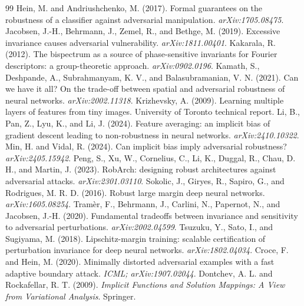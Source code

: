 \documentclass[11pt]{article}
\theoremstyle{plain}
\theoremstyle{definition}
\theoremstyle{remark}
\begin{document}
\begin{thebibliography}{99}
 Hein, M. and Andriushchenko, M. (2017). Formal guarantees on the robustness of a classifier against adversarial manipulation. \emph{arXiv:1705.08475}.
 Jacobsen, J.-H., Behrmann, J., Zemel, R., and Bethge, M. (2019). Excessive invariance causes adversarial vulnerability. \emph{arXiv:1811.00401}.
 Kakarala, R. (2012). The bispectrum as a source of phase-sensitive invariants for Fourier descriptors: a group-theoretic approach. \emph{arXiv:0902.0196}.
 Kamath, S., Deshpande, A., Subrahmanyam, K. V., and Balasubramanian, V. N. (2021). Can we have it all? On the trade-off between spatial and adversarial robustness of neural networks. \emph{arXiv:2002.11318}.
 Krizhevsky, A. (2009). Learning multiple layers of features from tiny images. University of Toronto technical report.
 Li, B., Pan, Z., Lyu, K., and Li, J. (2024). Feature averaging: an implicit bias of gradient descent leading to non-robustness in neural networks. \emph{arXiv:2410.10322}.
 Min, H. and Vidal, R. (2024). Can implicit bias imply adversarial robustness? \emph{arXiv:2405.15942}.
 Peng, S., Xu, W., Cornelius, C., Li, K., Duggal, R., Chau, D. H., and Martin, J. (2023). RobArch: designing robust architectures against adversarial attacks. \emph{arXiv:2301.03110}.
 Sokolic, J., Giryes, R., Sapiro, G., and Rodrigues, M. R. D. (2016). Robust large margin deep neural networks. \emph{arXiv:1605.08254}.
 Tram\`er, F., Behrmann, J., Carlini, N., Papernot, N., and Jacobsen, J.-H. (2020). Fundamental tradeoffs between invariance and sensitivity to adversarial perturbations. \emph{arXiv:2002.04599}.
 Tsuzuku, Y., Sato, I., and Sugiyama, M. (2018). Lipschitz-margin training: scalable certification of perturbation invariance for deep neural networks. \emph{arXiv:1802.04034}.
 Croce, F. and Hein, M. (2020). Minimally distorted adversarial examples with a fast adaptive boundary attack. \emph{ICML; arXiv:1907.02044}.
 Dontchev, A. L. and Rockafellar, R. T. (2009). \emph{Implicit Functions and Solution Mappings: A View from Variational Analysis}. Springer.

\end{thebibliography}
\end{document}
